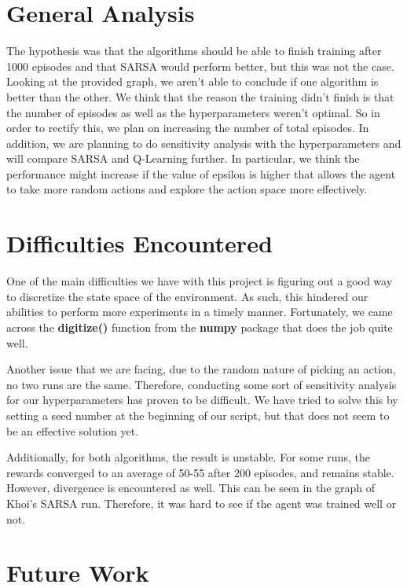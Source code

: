 \documentclass[nohyperref]{article}
\theoremstyle{plain}
\theoremstyle{definition}
\theoremstyle{remark}
\begin{document}
\section{General Analysis}

The hypothesis was that the algorithms should be able to finish training after 1000 episodes and that SARSA would perform better, but this was not the case.
Looking at the provided graph, we aren't able to conclude if one algorithm is better than the other.
We think that the reason the training didn't finish is that the number of episodes as well as the hyperparameters weren't optimal. 
So in order to rectify this, we plan on increasing the number of total episodes. 
In addition, we are planning to do sensitivity analysis with the hyperparameters and will compare SARSA and Q-Learning further.
In particular, we think the performance might increase if the value of epsilon is higher that allows the agent to take more random actions and explore the action space more effectively.

\section{Difficulties Encountered}

One of the main difficulties we have with this project is figuring out a good way to discretize the state space of the environment.
As such, this hindered our abilities to perform more experiments in a timely manner.
Fortunately, we came across the \textbf{digitize()} function from the \textbf{numpy} package that does the job quite well.

Another issue that we are facing, due to the random nature of picking an action, no two runs are the same. Therefore, conducting some sort of
sensitivity analysis for our hyperparameters has proven to be difficult. We have tried to solve this by setting a seed number at the beginning
of our script, but that does not seem to be an effective solution yet.

Additionally, for both algorithms, the result is unstable. For some runs, the rewards converged to an average of 50-55 after 200 episodes, and remains stable. However, divergence is encountered
as well. This can be seen in the graph of Khoi's SARSA run. Therefore, it was hard to see if the agent was trained well or not.

\section{Future Work}
\end{document}
